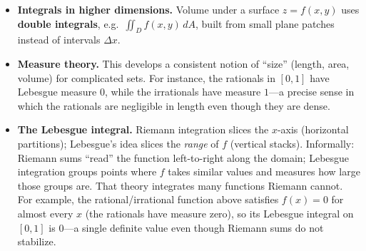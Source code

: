 \begin{itemize}[leftmargin=*]
  \item \textbf{Integrals in higher dimensions.} Volume under a surface $z = f(x,y)$ uses \textbf{double integrals}, e.g.\ $\displaystyle \iint_D f(x,y) \, dA$, built from small plane patches instead of intervals $\Delta x$.
  \item \textbf{Measure theory.} This develops a consistent notion of ``size'' (length, area, volume) for complicated sets. For instance, the rationals in $[0,1]$ have Lebesgue measure $0$, while the irrationals have measure $1$---a precise sense in which the rationals are negligible in length even though they are dense.
  \item \textbf{The Lebesgue integral.} Riemann integration slices the $x$-axis (horizontal partitions); Lebesgue's idea slices the \emph{range} of $f$ (vertical stacks). Informally: Riemann sums ``read'' the function left-to-right along the domain; Lebesgue integration groups points where $f$ takes similar values and measures how large those groups are. That theory integrates many functions Riemann cannot. For example, the rational/irrational function above satisfies $f(x)=0$ for almost every $x$ (the rationals have measure zero), so its Lebesgue integral on $[0,1]$ is $0$---a single definite value even though Riemann sums do not stabilize.
\end{itemize}
